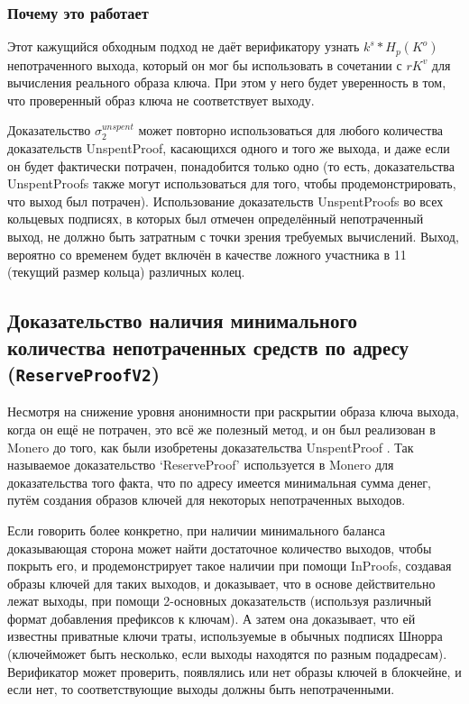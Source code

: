 \subsubsection*{Почему это работает}

Этот кажущийся обходным подход не даёт верификатору узнать $k^s*H_p(K^o)$ непотраченного выхода, который он мог бы использовать в сочетании с $r K^v$ для вычисления реального образа ключа. При этом у него будет уверенность в том, что проверенный образ ключа не соответствует выходу.

Доказательство $\sigma^{unspent}_2$ может повторно использоваться для любого количества \linebreak доказательств UnspentProof, касающихся одного и того же выхода, и даже если он будет фактически потрачен, понадобится только одно (то есть, доказательства UnspentProofs также могут использоваться для того, чтобы продемонстрировать, что выход был потрачен). Ис\-пользование доказательств UnspentProofs во всех кольцевых подписях, в которых был отмечен определённый непотраченный выход, не должно быть затратным с точки зрения требуемых вычислений. Выход, вероятно со временем будет включён в качестве ложного участника в 11 (текущий размер кольца) различных колец.


\subsection{Доказательство наличия минимального количества непотраченных средств по адресу ({\tt ReserveProofV2})}
\label{subsec:proofs-minimum-balance-reserveproof}

Несмотря на снижение уровня анонимности при раскрытии образа ключа выхода, когда он ещё не потрачен, это всё же полезный метод, и он был реализован в Monero \cite{reserveproofs-pull-request-3027} до того, как были изобретены доказательства UnspentProof \cite{unspent-proof-issue-68}. Так называемое доказательство `ReserveProof' используется в Monero для доказательства того факта, что по адресу имеется минимальная сумма денег, путём создания образов ключей для некоторых непотраченных выходов.

Если говорить более конкретно, при наличии минимального баланса доказывающая сторона может найти достаточное количество выходов, чтобы покрыть его, и продемонстрирует такое наличии при помощи InProofs, создавая образы ключей для таких выходов, и доказывает, что в основе действительно лежат выходы, при помощи 2-основных доказательств (используя различный формат добавления префиксов к ключам). А затем она доказывает, что ей известны приватные ключи траты, используемые в обычных подписях Шнорра (ключей\linebreak может быть несколько, если выходы находятся по разным подадресам). Верификатор может прове\-рить, появлялись или нет образы ключей в блокчейне, и если нет, то соответствующие выходы должны быть непотраченными.

